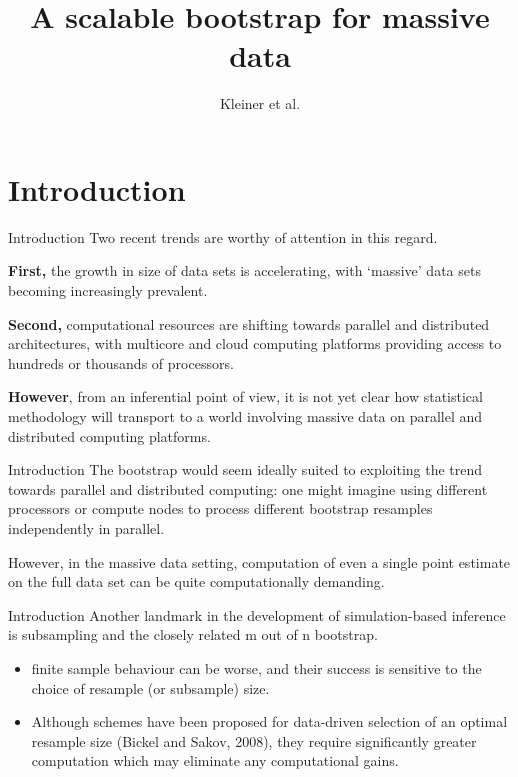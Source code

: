 \documentclass[12pt]{beamer}
\author{Kleiner et al.}
\title{A scalable bootstrap for massive data}
\begin{document}
\begin{frame}
\titlepage
\end{frame}


\section{Introduction}

\begin{frame}{Introduction}
Two recent trends are worthy of attention in this regard.

{\bf First,} the growth in size of data sets is
accelerating, with ‘massive’ data sets becoming increasingly prevalent.

{\bf Second,} computational resources are shifting towards parallel and distributed architectures, with multicore and cloud
computing platforms providing access to hundreds or thousands of processors.

{\bf However}, from an
inferential point of view, it is not yet clear how statistical methodology will transport to a world
involving massive data on parallel and distributed computing platforms.

\end{frame}



\begin{frame}{Introduction}
The bootstrap would seem ideally suited to exploiting the trend towards
parallel and distributed computing: one might imagine using different processors or compute
nodes to process different bootstrap resamples independently in parallel.

However, in the massive data setting,
computation of even a single point estimate on the full data set can be quite computationally
demanding.
\end{frame}

\begin{frame}{Introduction}
Another landmark in the development of simulation-based inference is subsampling and the closely related m out of n bootstrap.
\begin{itemize}
\item finite sample behaviour can be worse, and their
success is sensitive to the choice of resample (or subsample) size.
\item Although schemes have been
proposed for data-driven selection of an optimal resample size (Bickel and Sakov, 2008), they
require significantly greater computation which may eliminate any computational gains.
\end{itemize}
\end{frame}
\end{document}
